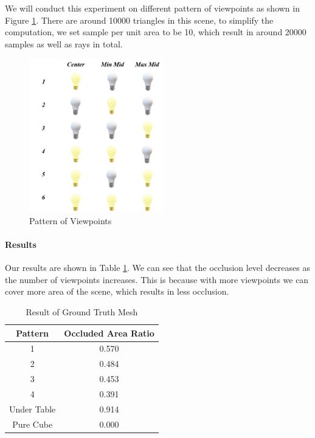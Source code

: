 \documentclass[11pt, a4paper,oneside,chapterprefix=false]{scrbook}
\begin{document}
\vspace{10pt}

We will conduct this experiment on different pattern of viewpoints as shown in Figure \ref{fig:pattern of viewpoints}. 
There are around 10000 triangles in this scene, to simplify the computation, we set sample per unit area to be 10, which result in around 20000 samples as well as rays in total. 

\begin{figure}[H]
    \centering
    \includegraphics*[width=0.52\textwidth]{figures/pattern of light sources.png}
    \caption{Pattern of Viewpoints}
    \label{fig:pattern of viewpoints}
\end{figure}

\vspace{10pt}

\paragraph{Results}

Our results are shown in Table \ref{tab:result of each experiment}. We can see that the occlusion level decreases as the number of viewpoints increases. This is because with more viewpoints we can cover more area of the scene, which results in less occlusion.

\vspace{10pt}

\begin{table}[h]
    \centering
    \begin{tabular}{|c|c|}
        \hline
        \textbf{Pattern} & \textbf{Occluded Area Ratio} \\
        \hline
        1 & 0.570 \\
        2 & 0.484 \\
		3 & 0.453 \\
		4 & 0.391 \\
        Under Table & 0.914 \\
        Pure Cube & 0.000 \\

        \hline
    \end{tabular}
    \caption{Result of Ground Truth Mesh}
    \label{tab:result of each experiment}
\end{table}
\end{document}
